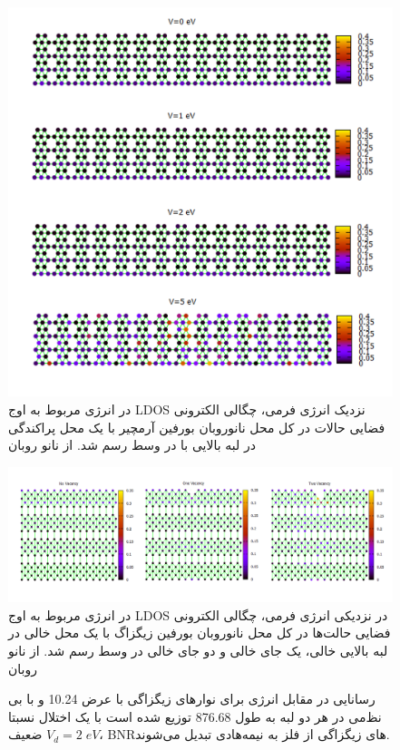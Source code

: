 \begin{figure}[!ht]
  \centering
  \includegraphics[width=1\linewidth]{./figures/Slide3.PNG}
  \caption{در انرژی مربوط به اوج \gls{LDOS} نزدیک انرژی فر‌می‌، چگالی الکترونی فضایی حالات در کل محل نانوروبان ‌بورفین آرمچیر با یک محل پراکندگی در لبه بالایی با  در وسط رسم شد. از نانو روبان}
  \label{armCSLDOS}
\end{figure}
\begin{figure}[!ht]
    \centering
    \includegraphics[width=1\linewidth]{./figures/Slide4.PNG}
    \caption{در انرژی مربوط به اوج \gls{LDOS} در نزدیکی انرژی فر‌می‌، چگالی الکترونی فضایی حالت‌ها در کل محل نانوروبان ‌بورفین زیگزاگ با یک محل خالی در لبه بالایی خالی، یک جای خالی و دو جای خالی در وسط رسم شد. از نانو روبان}
    \label{zigVSLDOS}
\end{figure}
\begin{figure}[!ht]
\centering

\caption{رسانایی در مقابل انرژی برای نوارهای زیگزاگی با عرض \lr{\AA} 10.24 و با بی نظ‌‌می‌‌ در هر دو لبه به طول \lr{\AA} 876.68 توزیع شده است
با یک اختلال نسبتا ضعیف $V_d=2\;eV$، \gls{BNR}‌های زیگزاگی از فلز به نیمه‌هادی تبدیل ‌‌می‌‌شوند.}
\label{zigzagdisorder}
\end{figure}
